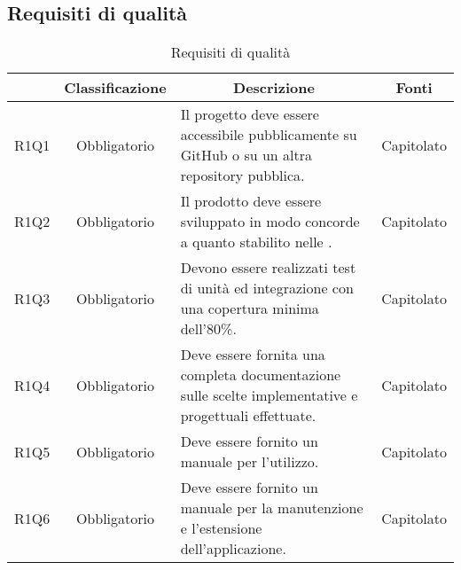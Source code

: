 \subsection{Requisiti di qualità} \label{subsection:requisiti_qualita}
\begin{table}[H]
    \centering
    \renewcommand{\arraystretch}{1.8}
    \begin{tabular}{c | c | p{6cm} | c}
        \rowcolor[HTML]{125E28}
        \multicolumn{1}{c}{\color[HTML]{FFFFFF} \textbf{Codice}}          &
        \multicolumn{1}{c}{\color[HTML]{FFFFFF} \textbf{Classificazione}} &
        \multicolumn{1}{c}{\color[HTML]{FFFFFF} \textbf{Descrizione}}     &
        \multicolumn{1}{c}{\color[HTML]{FFFFFF} \textbf{Fonti}}                                                                                                                                                    \\
        \hline
        R1Q1                                                              & Obbligatorio & Il progetto deve essere accessibile pubblicamente su GitHub\glo{} o su un altra repository\glo{} pubblica. & Capitolato \\
        R1Q2                                                              & Obbligatorio & Il prodotto deve essere sviluppato in modo concorde a quanto stabilito nelle \docNameNdP{}.                & Capitolato \\
        R1Q3                                                              & Obbligatorio & Devono essere realizzati test di unità ed integrazione con una copertura minima dell'80\%.                 & Capitolato \\
        R1Q4                                                              & Obbligatorio & Deve essere fornita una completa documentazione sulle scelte implementative e progettuali effettuate.      & Capitolato \\
        R1Q5                                                              & Obbligatorio & Deve essere fornito un manuale per l'utilizzo.                                                             & Capitolato \\
        R1Q6                                                              & Obbligatorio & Deve essere fornito un manuale per la manutenzione e l'estensione dell'applicazione.                       & Capitolato \\
    \end{tabular}
    \caption{Requisiti di qualità}
\end{table}

